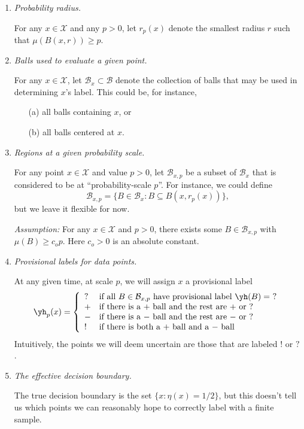 \documentclass{article}
\def\X{{\mathcal X}}
\def\B{{\mathcal B}}
\begin{document}
\begin{enumerate}
\item {\it Probability radius.}

For any $x \in \X$ and any $p > 0$, let $r_p(x)$ denote the smallest radius $r$ such that $\mu(B(x, r)) \geq p$. 

\item {\it Balls used to evaluate a given point.}

For any $x \in \X$, let $\B_x \subset \B$ denote the collection of balls that may be used in determining $x$'s label. This could be, for instance,
\begin{itemize}
\item[(a)] all balls containing $x$, or
\item[(b)] all balls centered at $x$.
\end{itemize}

\item {\it Regions at a given probability scale.}

For any point $x \in \X$ and value $p > 0$, let $\B_{x,p}$ be a subset of $\B_x$ that is considered to be at ``probability-scale $p$''. For instance, we could define
$$ \B_{x,p} = \{B \in \B_x: B \subseteq B(x,r_p(x))\},$$
but we leave it flexible for now. 

\noindent
{\it Assumption:} For any $x \in \X$ and $p > 0$, there exists some $B \in \B_{x,p}$ with $\mu(B) \geq c_o p$. Here $c_o > 0$ is an absolute constant.

\item {\it Provisional labels for data points.}

At any given time, at scale $p$, we will assign $x$ a provisional label
$$ \yh_p(x) = 
\left\{
\begin{array}{ll}
? & \mbox{if all $B \in \B_{x,p}$ have provisional label $\yh(B) = \ ?$} \\
+ & \mbox{if there is a $+$ ball and the rest are $+$ or $?$} \\ 
- & \mbox{if there is a $-$ ball and the rest are $-$ or $?$} \\ 
! & \mbox{if there is both a $+$ ball and a $-$ ball}
\end{array}
\right.
$$
Intuitively, the points we will deem uncertain are those that are labeled $!$ or $?$.

\item {\it The effective decision boundary.}

The true decision boundary is the set $\{x: \eta(x) = 1/2\}$, but this doesn't tell us which points we can reasonably hope to correctly label with a finite sample.


\end{enumerate}
\end{document}

